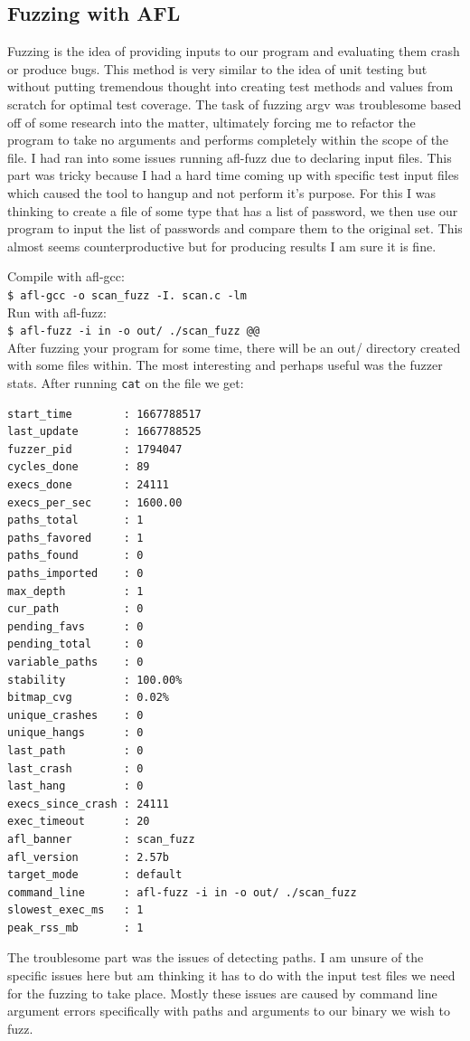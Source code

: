 \documentclass[12pt, letterpaper]{article}
\begin{document}
\begin{sloppypar}
\begin{flushleft}
\section*{Fuzzing with AFL}
Fuzzing is the idea of providing inputs to our program and evaluating them crash or produce bugs. 
This method is very similar to the idea of unit testing but without putting tremendous thought into 
creating test methods and values from scratch for optimal test coverage. The task of fuzzing argv 
was troublesome based off of some research into the matter, ultimately forcing me to refactor the 
program to take no arguments and performs completely within the scope of the file.
I had ran into some issues running afl-fuzz due to declaring input files. This part was tricky because 
I had a hard time coming up with specific test input files which caused the tool to hangup and not 
perform it's purpose. For this I was thinking to create a file of some type that has a list of password,
we then use our program to input the list of passwords and compare them to the original set. This almost
seems counterproductive but for producing results I am sure it is fine. 

Compile with afl-gcc: \\
\verb|$ afl-gcc -o scan_fuzz -I. scan.c -lm| \\

Run with afl-fuzz: \\
\verb|$ afl-fuzz -i in -o out/ ./scan_fuzz @@| \\

After fuzzing your program for some time, there will be an out/ directory created with 
some files within. The most interesting and perhaps useful was the fuzzer stats. After 
running \verb|cat| on the file we get:

\begin{lstlisting}
start_time        : 1667788517
last_update       : 1667788525
fuzzer_pid        : 1794047
cycles_done       : 89
execs_done        : 24111
execs_per_sec     : 1600.00
paths_total       : 1
paths_favored     : 1
paths_found       : 0
paths_imported    : 0
max_depth         : 1
cur_path          : 0
pending_favs      : 0
pending_total     : 0
variable_paths    : 0
stability         : 100.00%
bitmap_cvg        : 0.02%
unique_crashes    : 0
unique_hangs      : 0
last_path         : 0
last_crash        : 0
last_hang         : 0
execs_since_crash : 24111
exec_timeout      : 20
afl_banner        : scan_fuzz
afl_version       : 2.57b
target_mode       : default
command_line      : afl-fuzz -i in -o out/ ./scan_fuzz
slowest_exec_ms   : 1
peak_rss_mb       : 1
\end{lstlisting}
The troublesome part was the issues of detecting paths. I am unsure of the specific issues 
here but am thinking it has to do with the input test files we need for the fuzzing to take 
place. Mostly these issues are caused by command line argument errors specifically with 
paths and arguments to our binary we wish to fuzz. 


\end{flushleft}
\end{sloppypar}
\end{document}
